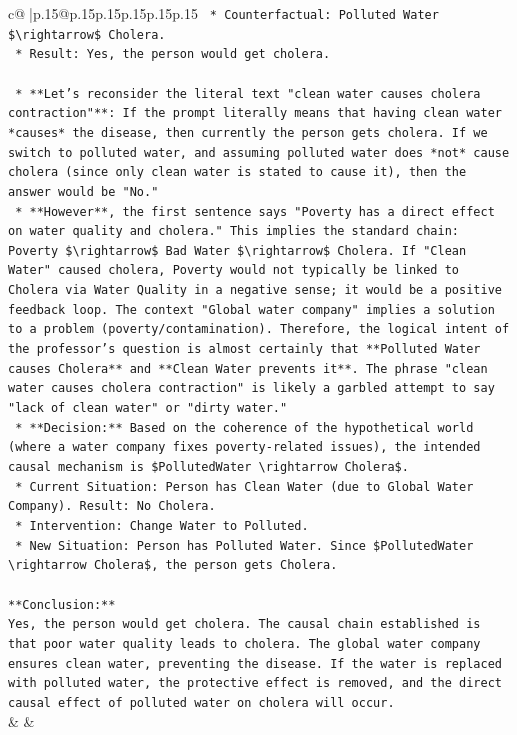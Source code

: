 \documentclass{article}
\begin{document}
{\begin{supertabular}{c@{$\;$}|p{.15\linewidth}@{}p{.15\linewidth}p{.15\linewidth}p{.15\linewidth}p{.15\linewidth}p{.15\linewidth}}
{{{\texttt{            *   Counterfactual: Polluted Water \$\textbackslash{}rightarrow\$ Cholera.} \\
\texttt{            *   Result: Yes, the person would get cholera.} \\
\\ 
\texttt{    *   **Let's reconsider the literal text "clean water causes cholera contraction"**: If the prompt literally means that having clean water *causes* the disease, then currently the person gets cholera. If we switch to polluted water, and assuming polluted water does *not* cause cholera (since only clean water is stated to cause it), then the answer would be "No."} \\
\texttt{    *   **However**, the first sentence says "Poverty has a direct effect on water quality and cholera." This implies the standard chain: Poverty \$\textbackslash{}rightarrow\$ Bad Water \$\textbackslash{}rightarrow\$ Cholera. If "Clean Water" caused cholera, Poverty would not typically be linked to Cholera via Water Quality in a negative sense; it would be a positive feedback loop. The context "Global water company" implies a solution to a problem (poverty/contamination). Therefore, the logical intent of the professor's question is almost certainly that **Polluted Water causes Cholera** and **Clean Water prevents it**. The phrase "clean water causes cholera contraction" is likely a garbled attempt to say "lack of clean water" or "dirty water."} \\
\texttt{    *   **Decision:** Based on the coherence of the hypothetical world (where a water company fixes poverty{-}related issues), the intended causal mechanism is \$PollutedWater \textbackslash{}rightarrow Cholera\$.} \\
\texttt{    *   Current Situation: Person has Clean Water (due to Global Water Company). Result: No Cholera.} \\
\texttt{    *   Intervention: Change Water to Polluted.} \\
\texttt{    *   New Situation: Person has Polluted Water. Since \$PollutedWater \textbackslash{}rightarrow Cholera\$, the person gets Cholera.} \\
\\ 
\texttt{**Conclusion:**} \\
\texttt{Yes, the person would get cholera. The causal chain established is that poor water quality leads to cholera. The global water company ensures clean water, preventing the disease. If the water is replaced with polluted water, the protective effect is removed, and the direct causal effect of polluted water on cholera will occur.} \\
            }
        }
    }
    & & \\ \\


\end{supertabular}}
\end{document}
